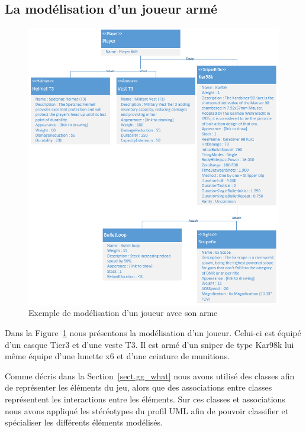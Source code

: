 \subsection{La modélisation d'un joueur armé}
\begin{figure}[H]
    \centering
    \includegraphics[width=14cm]{10_img/chap6/player68.PNG} 
    \caption{Exemple de modélisation d'un joueur avec son arme}
    \label{fig.player+weapon+equip}
\end{figure}

Dans la Figure~\ref{fig.player+weapon+equip} nous présentons la modélisation d'un joueur.
Celui-ci est équipé d'un casque Tier3 et d'une veste T3. 
Il est armé d'un sniper de type Kar98k lui même équipe d'une lunette x6 et d'une ceinture de munitions.

Comme décris dans la Section~\ref{sect.gg_what} nous avons utilisé des classes afin de représenter les éléments du jeu, alors que des associations entre classes représentent les interactions entre les éléments.
Sur ces classes et associations nous avons appliqué les stéréotypes du profil UML afin de pouvoir classifier et spécialiser les différents éléments modélisés.



